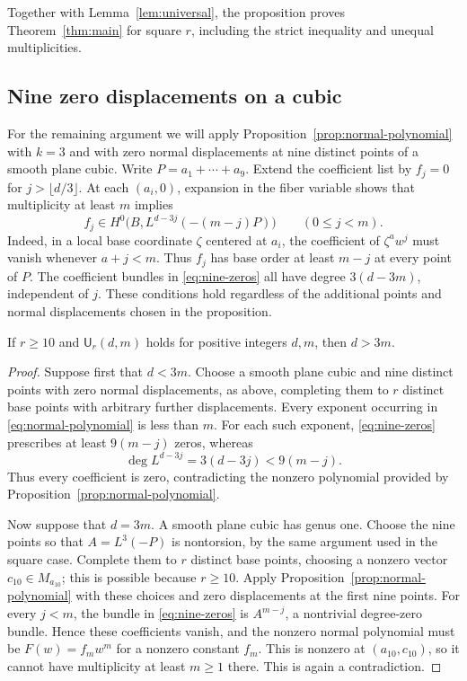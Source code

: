 Together with Lemma~\ref{lem:universal}, the proposition proves
Theorem~\ref{thm:main} for square $r$, including the strict inequality
and unequal multiplicities.

\subsection{Nine zero displacements on a cubic}

For the remaining argument we will apply
Proposition~\ref{prop:normal-polynomial} with $k=3$ and with zero
normal displacements at nine distinct points of a smooth plane cubic.
Write $P=a_1+\cdots+a_9$.  Extend the coefficient list by $f_j=0$
for $j>\lfloor d/3\rfloor$.  At each $(a_i,0)$, expansion in the
fiber variable shows that multiplicity at least $m$ implies
\begin{equation}
\label{eq:nine-zeros}
 f_j\in H^0\bigl(B,L^{d-3j}(-(m-j)P)\bigr)
 \qquad(0\le j<m).
\end{equation}
Indeed, in a local base coordinate $\zeta$ centered at $a_i$, the
coefficient of $\zeta^a w^j$ must vanish whenever $a+j<m$.
Thus $f_j$ has base order at least $m-j$ at every point of $P$.
The coefficient bundles in \eqref{eq:nine-zeros} all have degree
$3(d-3m)$, independent of $j$.  These conditions hold regardless of
the additional points and normal displacements chosen in the proposition.

\begin{lemma}
\label{lem:cubic-low-degree}
If $r\ge10$ and $\mathsf U_r(d,m)$ holds for positive integers $d,m$,
then $d>3m$.
\end{lemma}

\begin{proof}
Suppose first that $d<3m$.  Choose a smooth plane cubic and nine
distinct points with zero normal displacements, as above, completing
them to $r$ distinct base points with arbitrary further displacements.
Every exponent occurring in \eqref{eq:normal-polynomial} is less than
$m$.  For each such exponent, \eqref{eq:nine-zeros} prescribes at
least $9(m-j)$ zeros, whereas
\[
 \deg L^{d-3j}=3(d-3j)<9(m-j).
\]
Thus every coefficient is zero, contradicting the nonzero polynomial
provided by Proposition~\ref{prop:normal-polynomial}.

Now suppose that $d=3m$.  A smooth plane cubic has genus one.  Choose
the nine points so that $A=L^3(-P)$ is nontorsion, by the same
argument used in the square case.  Complete them to $r$ distinct
base points, choosing a nonzero vector $c_{10}\in M_{a_{10}}$;
this is possible because $r\ge10$.  Apply
Proposition~\ref{prop:normal-polynomial} with these choices and zero
displacements at the first nine points.
For every $j<m$, the bundle in
\eqref{eq:nine-zeros} is $A^{m-j}$, a nontrivial degree-zero bundle.
Hence these coefficients vanish, and the nonzero normal polynomial
must be $F(w)=f_mw^m$ for a nonzero constant $f_m$.  This is nonzero at
$(a_{10},c_{10})$, so it cannot have multiplicity at least $m\ge1$
there.  This is again a contradiction.
\end{proof}
